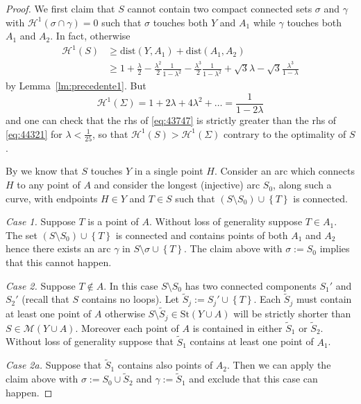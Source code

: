 \documentclass{article}
\renewcommand{\H}{\mathcal H}
\newcommand{\ENCLOSE}[1]{\left\{#1\right\}}
\newcommand{\St}{\mathrm{St}}
\newcommand{\M}{\mathcal{M}}
\renewcommand{\H}{\mathcal{H}}
\newcommand{\dist}{\mathrm{dist}}
\theoremstyle{definition}
\theoremstyle{remark}
\begin{document}
\begin{proof}
We first claim that $S$ cannot contain 
two compact connected sets 
$\sigma$ and $\gamma$
with $\H^1(\sigma\cap \gamma)=0$
such that $\sigma$ touches both $Y$ and $A_1$ 
while $\gamma$ touches both $A_1$ and $A_2$.
In fact, otherwise
\begin{equation}
\label{eq:43747}
\begin{aligned}
  \H^1(S)
  &\ge \dist(Y, A_1) + \dist(A_1, A_2)
  \\
  &\ge 
  1+ \frac{\lambda} 2 
    - \frac{\lambda^2}{2}\frac{1}{1-\lambda^2}
    - \frac{\lambda^3}{2}\frac{1}{1-\lambda^2} 
   +
   \sqrt 3 \lambda - \sqrt 3 \frac{\lambda^3}{1-\lambda}
\end{aligned}
\end{equation}
by Lemma~\ref{lm:precedente1}.
But 
\begin{equation}\label{eq:44321}
  \H^1(\Sigma) 
  = 1 + 2 \lambda + 4 \lambda^2 + \dots 
  = \frac{1}{1-2\lambda}
\end{equation}
and one can check that the rhs of \eqref{eq:43747} is
strictly greater than the rhs of \eqref{eq:44321}
for $\lambda < \frac 1 {25}$,
so that $\H^1(S) > \H^1(\Sigma)$ contrary 
to the optimality of $S$.

By \cite{PaoSte} we know that $S$ touches $Y$ in a single point $H$.
Consider an arc which connects $H$ to any point of $A$
and consider the longest (injective) arc $S_0$, along such a curve,
with endpoints $H\in Y$ and $T\in S$
such that $(S\setminus S_0) \cup \ENCLOSE{T}$ is connected.

\emph{Case 1.} Suppose $T$ is a point of $A$.
Without loss of generality suppose $T\in A_1$.
The set $(S\setminus S_0)\cup\ENCLOSE{T}$
is connected and contains points of both $A_1$
and $A_2$ hence there exists an arc $\gamma$ in $S\setminus \sigma\cup\ENCLOSE{T}$.
The claim above with $\sigma:=S_0$ implies that this cannot happen.

\emph{Case 2.} Suppose $T\not \in A$.
In this case $S\setminus S_0$ has two connected components 
$S_1'$ and $S_2'$ (recall that $S$ contains no loops). 
Let $\tilde S_j:=S_j'\cup \ENCLOSE{T}$.
Each $\tilde S_j$ must contain at least one point of $A$ otherwise 
$S\setminus \tilde S_j\in \St(Y\cup A)$ will be 
strictly shorter than $S\in \M(Y\cup A)$.
Moreover each point of $A$ is contained in either $\tilde S_1$ or $\tilde S_2$.
Without loss of generality suppose that $\tilde S_1$ 
contains at least one point of $A_1$.

\emph{Case 2a.} Suppose that $\tilde S_1$ contains also points of $A_2$.
Then we can apply the claim above with 
$\sigma:= S_0 \cup \tilde S_2$ and 
$\gamma:= \tilde S_1$ and exclude that this case can happen.


\end{proof}
\end{document}
